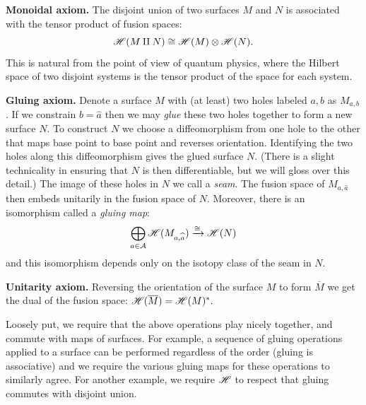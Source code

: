 {\bf Monoidal axiom.}
The disjoint union of two surfaces $M$ and $N$ 
is associated with
the tensor product of fusion spaces:
$$
    \mathscr{H}(M\amalg N) \cong \mathscr{H}(M)\otimes \mathscr{H}(N).
$$
This is natural from the point of view of quantum
physics, where the Hilbert space of two disjoint
systems is the tensor product of the space for
each system.

{\bf Gluing axiom.}
Denote a surface $M$ with (at least) two holes
labeled $a, b$ as $M_{a,b}$. 
If we constrain $b=\widehat{a}$ 
then we may \emph{glue} these two holes together
to form a new surface $N$.
To construct $N$ we choose a diffeomorphism from one
hole to the other that maps base point to base point 
and reverses orientation.
Identifying the two holes along this diffeomorphism
gives the glued surface $N$.
(There is a slight technicality in ensuring that $N$ is
then differentiable, but we will gloss over this detail.)
The image of these holes in $N$ we call a \emph{seam}.
The fusion space of $M_{a,\widehat{a}}$ then embeds unitarily in the fusion
space of $N$.
Moreover, there is an isomorphism called
a \emph{gluing map}:
$$
    \bigoplus_{a\in\mathcal{A}} \mathscr{H}(M_{a,\widehat{a}}) \xrightarrow{\cong} \mathscr{H}(N)
$$
and this isomorphism depends only on the isotopy class of 
the seam in $N.$

{\bf Unitarity axiom.}
Reversing the orientation of the surface $M$
to form $\overline{M}$ we get the dual of the fusion space:
$\mathscr{H}(\overline{M})=\mathscr{H}(M)^*.$

Loosely put, we require that the above operations play nicely together,
and commute with maps of surfaces.
For example,
a sequence of gluing operations 
applied to a surface can
be performed regardless of the order (gluing is associative)
and we require the various gluing maps for these operations to similarly agree.
For another example, we require $\mathscr{H}$ to respect that gluing
commutes with disjoint union.

